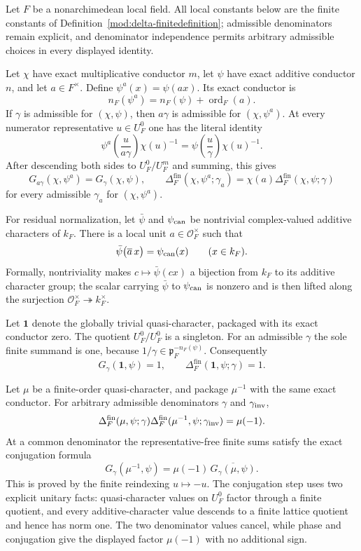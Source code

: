 \begin{theorem}\label{mod:delta-elementary}
Let $F$ be a nonarchimedean local field.  All local constants below are the
finite constants of Definition~\ref{mod:delta-finitedefinition}; admissible
denominators remain explicit, and denominator independence permits arbitrary
admissible choices in every displayed identity.

Let $\chi$ have exact multiplicative conductor $m$, let $\psi$ have exact
additive conductor $n$, and let $a\in F^\times$.  Define
$\psi^a(x)=\psi(ax)$.  Its exact conductor is
\[
 n_F(\psi^a)=n_F(\psi)+\operatorname{ord}_F(a).
\]
If $\gamma$ is admissible for $(\chi,\psi)$, then $a\gamma$ is admissible
for $(\chi,\psi^a)$.  At every numerator representative $u\in U_F^0$ one
has the literal identity
\[
 \psi^a\!\left(\frac{u}{a\gamma}\right)\chi(u)^{-1}
 =\psi\!\left(\frac{u}{\gamma}\right)\chi(u)^{-1}.
\]
After descending both sides to $U_F^0/U_F^m$ and summing, this gives
\[
 G_{a\gamma}(\chi,\psi^a)=G_\gamma(\chi,\psi),
 \qquad
 \Delta_F^{\mathrm{fin}}(\chi,\psi^a;\gamma_a)
 =\chi(a)\Delta_F^{\mathrm{fin}}(\chi,\psi;\gamma)
\]
for every admissible $\gamma_a$ for $(\chi,\psi^a)$.

For residual normalization, let $\bar\psi$ and $\psi_{\rm can}$ be
nontrivial complex-valued additive characters of $k_F$.  There is a local
unit $a\in\mathcal O_F^\times$ such that
\[
 \bar\psi\bigl(\overline a\,x\bigr)=\psi_{\rm can}(x)
 \qquad(x\in k_F).
\]
Formally, nontriviality makes
$c\mapsto\bar\psi(cx)$ a bijection from $k_F$ to its additive character
group; the scalar carrying $\bar\psi$ to $\psi_{\rm can}$ is nonzero and is
then lifted along the surjection
$\mathcal O_F^\times\twoheadrightarrow k_F^\times$.

Let $\mathbf 1$ denote the globally trivial quasi-character, packaged with
its exact conductor zero.  The quotient $U_F^0/U_F^0$ is a singleton.  For
an admissible $\gamma$ the sole finite summand is one, because
$1/\gamma\in\mathfrak p_F^{-n_F(\psi)}$.  Consequently
\[
 G_\gamma(\mathbf 1,\psi)=1,
 \qquad
 \Delta_F^{\mathrm{fin}}(\mathbf 1,\psi;\gamma)=1.
\]

Let $\mu$ be a finite-order quasi-character, and package $\mu^{-1}$ with
the same exact conductor.  For arbitrary admissible denominators $\gamma$
and $\gamma_{\rm inv}$,
\[
 \Delta_F^{\mathrm{fin}}(\mu,\psi;\gamma)
 \Delta_F^{\mathrm{fin}}(\mu^{-1},\psi;\gamma_{\rm inv})
 =\mu(-1).
\]
At a common denominator the representative-free finite sums satisfy the
exact conjugation formula
\[
 G_\gamma(\mu^{-1},\psi)
 =\mu(-1)\,\overline{G_\gamma(\mu,\psi)}.
\]
This is proved by the finite reindexing $u\mapsto-u$.  The conjugation step
uses two explicit unitary facts: quasi-character values on $U_F^0$ factor
through a finite quotient, and every additive-character value descends to
a finite lattice quotient and hence has norm one.  The two denominator
values cancel, while phase and conjugation give the displayed factor
$\mu(-1)$ with no additional sign.


\end{theorem}
